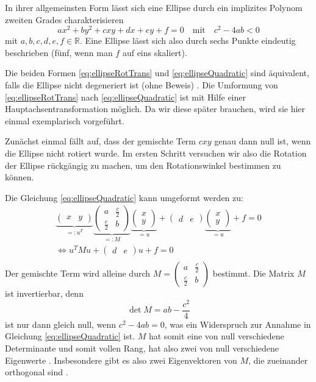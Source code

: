 In ihrer allgemeinsten Form lässt sich eine Ellipse durch ein implizites Polynom zweiten Grades charakterisieren
\begin{equation} \label{eq:ellipseQuadratic}
ax^2 + by^2 + cxy + dx + ey + f = 0 \quad \text{mit}\quad c^2-4ab < 0
\end{equation} 
mit $a,b,c,d,e,f \in \mathbb{R}$. Eine Ellipse lässt sich also durch sechs Punkte eindeutig beschrieben (fünf, wenn man $f$ auf eins skaliert).


Die beiden Formen \ref{eq:ellipseRotTrans} und \ref{eq:ellipseQuadratic} sind äquivalent, falls die Ellipse nicht degeneriert ist (ohne Beweis) \cite{Lawrence1972}. Die Umformung von \ref{eq:ellipseRotTrans} nach \ref{eq:ellipseQuadratic} ist mit Hilfe einer Hauptachsentransformation möglich. 
Da wir diese später brauchen, wird sie hier einmal exemplarisch vorgeführt. 

Zunächst einmal fällt auf, dass der gemischte Term $cxy$ genau dann null ist, wenn die Ellipse nicht rotiert wurde. Im ersten Schritt versuchen wir also die Rotation der Ellipse rückgängig zu machen, um den Rotationswinkel bestimmen zu können.

Die Gleichung \ref{eq:ellipseQuadratic} kann umgeformt werden zu:
\begin{equation*}
\begin{aligned}
\underbrace{\begin{pmatrix}x & y\end{pmatrix}}_{=:u^T}\underbrace{\begin{pmatrix}a & \frac{c}{2} \\ \frac{c}{2} & b\end{pmatrix}}_{=: M}\underbrace{\begin{pmatrix}x \\ y\end{pmatrix}}_{=u} +\begin{pmatrix}d & e\end{pmatrix}\underbrace{\begin{pmatrix}x \\ y\end{pmatrix}}_{=u}+ f = 0 \\
\Leftrightarrow u^TMu +\begin{pmatrix}d & e\end{pmatrix}u + f = 0 \\
\end{aligned}
\end{equation*} 
Der gemischte Term wird alleine durch $M = \begin{pmatrix}a & \frac{c}{2} \\ \frac{c}{2} & b\end{pmatrix}$ bestimmt. Die Matrix $M$ ist invertierbar, denn
\[
\det M = ab - \dfrac{c^2}{4}
\] ist nur dann gleich null, wenn $c^2 - 4ab = 0$, was ein Widerspruch zur Annahme in Gleichung \ref{eq:ellipseQuadratic} ist. $M$ hat somit eine von null verschiedene Determinante und somit vollen Rang, hat also zwei von null verschiedene Eigenwerte \cite[S. 199]{Bosch2006}. Insbesondere gibt es also zwei Eigenvektoren von $M$, die zueinander orthogonal sind \cite[S. 198]{Bosch2006}.


